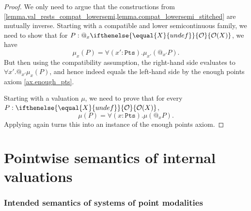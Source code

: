 \documentclass[reqno,11pt]{amsproc}
\makeatletter
\theoremstyle{plain}
\theoremstyle{definition}
\newcommand{\pt}{x}
\newcommand{\Op}[1][undef]{\ifthenelse{\equal{#1}{undef}}{\mathcal{O}}{\mathcal{O}(#1)}}
\newcommand{\pts}{\mathtt{Pts}}		%
\newcommand{\atsymbol}{{@}}
\newcommand{\at}[1][\pt]{\atsymbol_{#1}}
\numberwithin{equation}{section}
\makeatother
\begin{document}
\begin{proof}
	We only need to argue that the constructions from \cref{lemma.val_rests_compat_lowersemi,lemma.compat_lowersemi_stitched} are mutually inverse. Starting with a compatible and lower semicontinuous family, we need to show that for $P : \at \Op[X]$, we have
	\[
		\mu_\pt(P) = \forall (\pt' : \pts) . \mu_{\pt'}( \at[\pt'] P).
	\]
	But then using the compatibility assumption, the right-hand side evaluates to $\forall \pt' . \at[\pt'] \mu_\pt(P)$, and hence indeed equals the left-hand side by the enough points axiom \ref{ax.enough_pts}.

	Starting with a valuation $\mu$, we need to prove that for every $P : \Op[X]$,
	\[
		\mu(P) = \forall (\pt : \pts) . \mu(\at P).
	\]
	Applying  again turns this into an instance of the enough points axiom.
\end{proof}

\newpage
\part{Pointwise semantics of internal valuations}

\section{Intended semantics of systems of point modalities}
\label{points_semantics}
\end{document}
